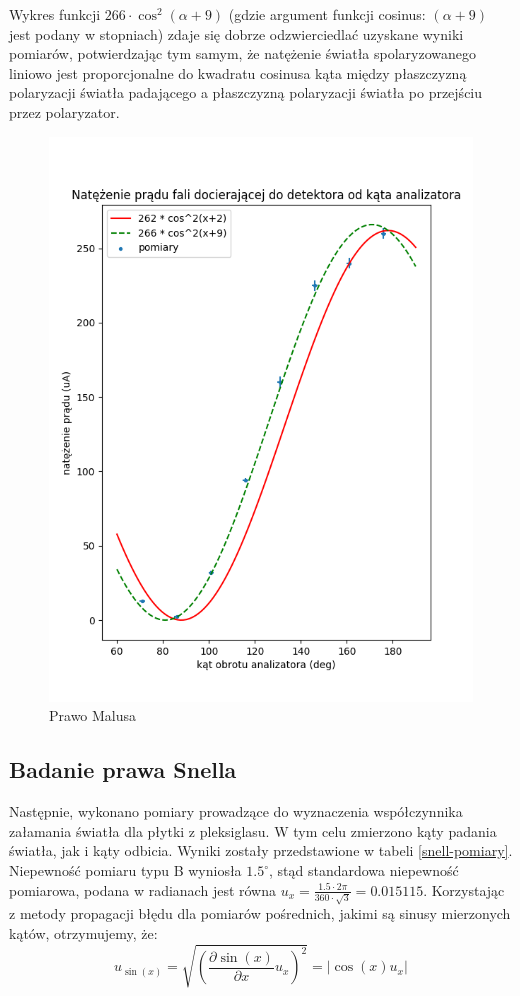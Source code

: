 \documentclass[a4paper]{article}
\newlength{\du}
\begin{document}
Wykres funkcji $266 \cdot \cos^2(\alpha + 9)$ (gdzie argument funkcji cosinus: $(\alpha + 9)$ jest podany w stopniach) zdaje się dobrze odzwierciedlać uzyskane wyniki pomiarów, potwierdzając tym samym, że natężenie światła spolaryzowanego liniowo jest proporcjonalne do kwadratu cosinusa kąta między płaszczyzną polaryzacji światła padającego a płaszczyzną polaryzacji światła po przejściu przez polaryzator.


\begin{figure}[h]
\centering
\includegraphics[scale=0.6]{malus.png}
\caption{Prawo Malusa}
\label{malus-wykres}
\end{figure}


\subsection{Badanie prawa Snella}
Następnie, wykonano pomiary prowadzące do wyznaczenia współczynnika załamania światła dla płytki z pleksiglasu.
W tym celu zmierzono kąty padania światła, jak i kąty odbicia.
Wyniki zostały przedstawione w tabeli \ref{snell-pomiary}.
Niepewność pomiaru typu B wyniosła $1.5^\circ$, stąd standardowa niepewność pomiarowa, podana w radianach jest równa $u_x = \frac{1.5 \cdot 2 \pi}{360 \cdot \sqrt{3}} = 0.015115$.
Korzystając z metody propagacji błędu dla pomiarów pośrednich, jakimi są sinusy mierzonych kątów, otrzymujemy, że:
\[
	u_{\sin(x)} = \sqrt{\left(\frac{\partial \sin(x)}{\partial x}u_{x}\right)^2} = \left|\cos(x)u_{x}\right|
\]
\end{document}
